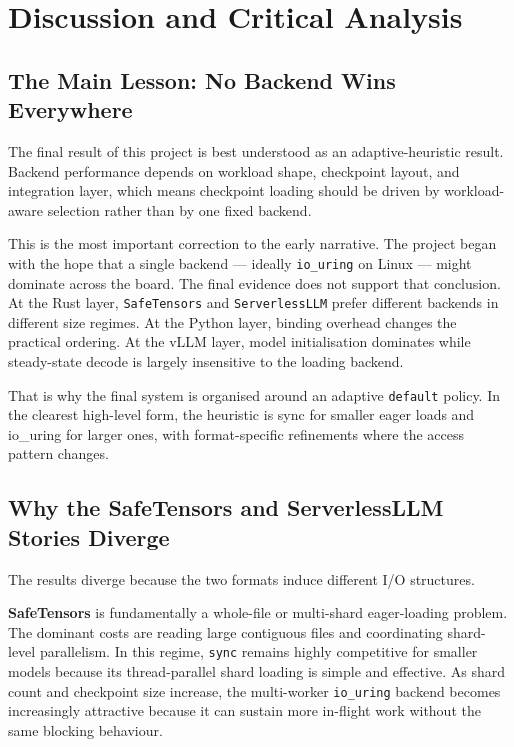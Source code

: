 \chapter{Discussion and Critical Analysis}
\label{chap:discussion}

\section{The Main Lesson: No Backend Wins Everywhere}

The final result of this project is best understood as an adaptive-heuristic result. Backend performance depends on workload shape, checkpoint layout, and integration layer, which means checkpoint loading should be driven by workload-aware selection rather than by one fixed backend.

This is the most important correction to the early narrative. The project began with the hope that a single backend --- ideally \texttt{io\_uring} on Linux --- might dominate across the board. The final evidence does not support that conclusion. At the Rust layer, \texttt{SafeTensors} and \texttt{ServerlessLLM} prefer different backends in different size regimes. At the Python layer, binding overhead changes the practical ordering. At the vLLM layer, model initialisation dominates while steady-state decode is largely insensitive to the loading backend.

That is why the final system is organised around an adaptive \texttt{default} policy. In the clearest high-level form, the heuristic is sync for smaller eager loads and io\_uring for larger ones, with format-specific refinements where the access pattern changes.

\section{Why the SafeTensors and ServerlessLLM Stories Diverge}

The results diverge because the two formats induce different I/O structures.

\textbf{SafeTensors} is fundamentally a whole-file or multi-shard eager-loading problem. The dominant costs are reading large contiguous files and coordinating shard-level parallelism. In this regime, \texttt{sync} remains highly competitive for smaller models because its thread-parallel shard loading is simple and effective. As shard count and checkpoint size increase, the multi-worker \texttt{io\_uring} backend becomes increasingly attractive because it can sustain more in-flight work without the same blocking behaviour.

